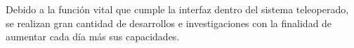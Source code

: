Debido a la  función vital que cumple la interfaz dentro del sistema teleoperado, se realizan gran cantidad de desarrollos e investigaciones con la finalidad de aumentar cada día más sus capacidades.\\





